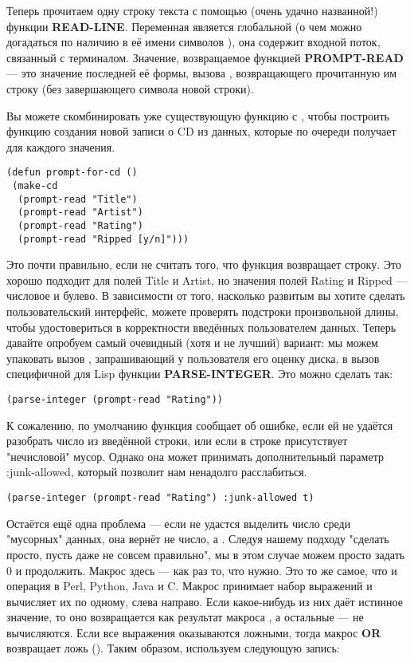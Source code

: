 Теперь прочитаем одну строку текста с помощью (очень удачно названной!) функции
\textbf{READ-LINE}. Переменная  является глобальной (о чем можно
догадаться по наличию в её имени символов \code{*}), она содержит входной поток, связанный
с терминалом. Значение, возвращаемое функцией \textbf{PROMPT-READ} --- это значение
последней её формы, вызова , возвращающего прочитанную им строку (без
завершающего символа новой строки).

Вы можете скомбинировать уже существующую функцию  с ,
чтобы построить функцию создания новой записи о CD из данных, которые  по
очереди получает для каждого значения.

\begin{lstlisting}
(defun prompt-for-cd ()
 (make-cd
  (prompt-read "Title")
  (prompt-read "Artist")
  (prompt-read "Rating")
  (prompt-read "Ripped [y/n]")))
\end{lstlisting}

Это почти правильно, если не считать того, что функция  возвращает
строку. Это хорошо подходит для полей Title и Artist, но значения полей Rating и Ripped
--- числовое и булево. В зависимости от того, насколько развитым вы хотите сделать
пользовательский интерфейс, можете проверять подстроки произвольной длины, чтобы
удостовериться в корректности введённых пользователем данных. Теперь давайте опробуем
самый очевидный (хотя и не лучший) вариант: мы можем упаковать вызов ,
запрашивающий у пользователя его оценку диска, в вызов специфичной для Lisp функции
\textbf{PARSE-INTEGER}. Это можно сделать так:

\begin{lstlisting}
(parse-integer (prompt-read "Rating"))
\end{lstlisting}

К сожалению, по умолчанию функция  сообщает об ошибке, если ей не
удаётся разобрать число из введённой строки, или если в строке присутствует "нечисловой"
мусор. Однако она может принимать дополнительный параметр :junk-allowed, который позволит
нам ненадолго расслабиться.

\begin{lstlisting}
(parse-integer (prompt-read "Rating") :junk-allowed t)
\end{lstlisting}

Остаётся ещё одна проблема --- если  не удастся выделить число среди
"мусорных" данных, она вернёт не число, а . Следуя нашему подходу "сделать
просто, пусть даже не совсем правильно", мы в этом случае можем просто задать 0 и
продолжить. Макрос  здесь --- как раз то, что нужно. Это то же самое, что и
операция \code{||} в Perl, Python, Java и C. Макрос принимает набор выражений и
вычисляет их по одному, слева направо. Если какое-нибудь из них даёт истинное значение, то
оно возвращается как результат макроса , а остальные --- не вычисляются. Если
все выражения оказываются ложными, тогда макрос \textbf{OR} возвращает ложь
(). Таким образом, используем следующую запись:

